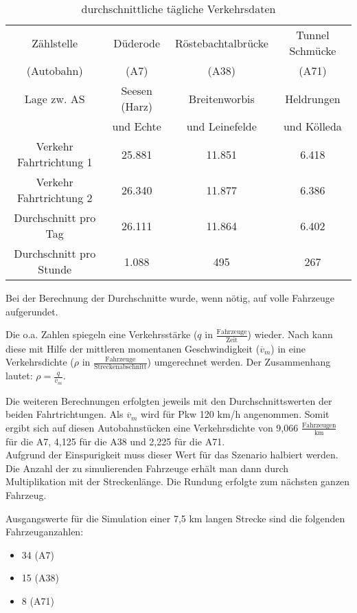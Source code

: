 \begin{table}[hptb]
\begin{center}
\setlength{\tabcolsep}{0.5em} %
{\renewcommand{\arraystretch}{1.2}%
\begin{tabular}{| c  c  c  c |}
\hline 
Zählstelle & Düderode & Röstebachtalbrücke & Tunnel Schmücke \\
(Autobahn) & (A7) & (A38) & (A71) \\
\hline 
Lage zw. AS & Seesen (Harz) & Breitenworbis & Heldrungen \\
 & und Echte & und Leinefelde & und Kölleda \\
\hline 
Verkehr Fahrtrichtung 1 & 25.881 & 11.851 & 6.418 \\ 
\hline 
Verkehr Fahrtrichtung 2 & 26.340 & 11.877 & 6.386 \\ 
\hline 
Durchschnitt pro Tag & 26.111 & 11.864 & 6.402 \\ 
\hline 
Durchschnitt pro Stunde & 1.088 & 495 & 267 \\ \hline
\end{tabular}
}
\caption{durchschnittliche tägliche Verkehrsdaten}
\label{tab:reale-verkehrsdaten}
\end{center}
\end{table}

\noindent
Bei der Berechnung der Durchschnitte wurde, wenn nötig, auf volle Fahrzeuge aufgerundet.

Die o.a. Zahlen spiegeln eine Verkehrsstärke ($q$ in $ \frac{\text{Fahrzeuge}}{\text{Zeit}} $) wieder.
Nach \cite{verkehrsplanung} kann diese mit Hilfe der mittleren momentanen Geschwindigkeit ($\overline{v}_{m}$) in eine Verkehrsdichte ($\rho$ in $ \frac{\text{Fahrzeuge}}{\text{Streckenabschnitt}} $) umgerechnet werden.
Der Zusammenhang lautet: $ \rho = \frac{q}{\overline{v}_{m}} $.

Die weiteren Berechnungen erfolgten jeweils mit den Durchschnittswerten der beiden Fahrtrichtungen.
Als $\overline{v}_{m}$ wird für Pkw 120 km/h angenommen.
Somit ergibt sich auf diesen Autobahnstücken eine Verkehrsdichte von 9,066 $\frac{\text{Fahrzeugen}}{\text{km}}$ für die A7, 4,125 für die A38 und 2,225 für die A71.
\\
Aufgrund der Einspurigkeit muss dieser Wert für das Szenario halbiert werden. 
Die Anzahl der zu simulierenden Fahrzeuge erhält man dann durch Multiplikation mit der Streckenlänge.
Die Rundung erfolgte zum nächsten ganzen Fahrzeug.

Ausgangswerte für die Simulation einer 7,5 km langen Strecke sind die folgenden Fahrzeuganzahlen: 
\begin{itemize}
	\itemsep0em
	\item 34 (A7)
	\item 15 (A38)
	\item 8 (A71)
\end{itemize}

